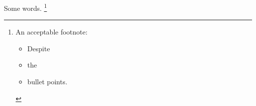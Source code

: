 \documentclass{article}
\begin{document}
Some words.%
  \footnote{An acceptable footnote:
  \begin{itemize}
  \item Despite
  \item the
  \item bullet points.
  \end{itemize} }
\end{document}

